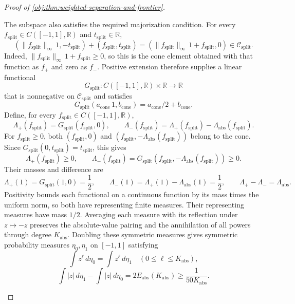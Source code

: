 \documentclass[11pt]{article}
\begin{document}
\begin{proof}[Proof of \cref{obj:thm:weighted-separation-and-frontier}]
\begin{enumerate}
The subspace also satisfies the required majorization condition. For every
\(f_{\mathrm{split}}\in C([-1,1],\mathbb R)\) and
\(t_{\mathrm{split}}\in\mathbb R\),
\[
(\|f_{\mathrm{split}}\|_\infty\,1,-t_{\mathrm{split}})
 +(f_{\mathrm{split}},t_{\mathrm{split}})
=(\|f_{\mathrm{split}}\|_\infty\,1+f_{\mathrm{split}},0)
\in\mathcal C_{\mathrm{split}}.
\]
Indeed, \(\|f_{\mathrm{split}}\|_\infty\,1+f_{\mathrm{split}}\ge0\), so this is the cone element obtained with that function as \(f_+\) and zero as \(f_-\). Positive extension therefore supplies a linear functional
\[
G_{\mathrm{split}}:C([-1,1],\mathbb R)\times\mathbb R\longrightarrow\mathbb R
\]
that is nonnegative on \(\mathcal C_{\mathrm{split}}\) and satisfies
\[
G_{\mathrm{split}}(a_{\mathrm{cone}}\,1,b_{\mathrm{cone}})
=a_{\mathrm{cone}}/2+b_{\mathrm{cone}}.
\]
Define, for every \(f_{\mathrm{split}}\in C([-1,1],\mathbb R)\),
\[
\Lambda_+(f_{\mathrm{split}})=G_{\mathrm{split}}(f_{\mathrm{split}},0),
\qquad
\Lambda_-(f_{\mathrm{split}})
=\Lambda_+(f_{\mathrm{split}})-\Lambda_{\mathrm{abs}}(f_{\mathrm{split}}).
\]
For \(f_{\mathrm{split}}\ge0\), both
\((f_{\mathrm{split}},0)\) and
\((f_{\mathrm{split}},-\Lambda_{\mathrm{abs}}(f_{\mathrm{split}}))\) belong to the cone. Since
\(G_{\mathrm{split}}(0,t_{\mathrm{split}})=t_{\mathrm{split}}\), this gives
\[
\Lambda_+(f_{\mathrm{split}})\ge0,
\qquad
\Lambda_-(f_{\mathrm{split}})
=G_{\mathrm{split}}(f_{\mathrm{split}},-\Lambda_{\mathrm{abs}}(f_{\mathrm{split}}))\ge0.
\]
Their masses and difference are
\[
\Lambda_+(1)=G_{\mathrm{split}}(1,0)=\frac12,
\qquad
\Lambda_-(1)=\Lambda_+(1)-\Lambda_{\mathrm{abs}}(1)=\frac12,
\qquad
\Lambda_+-\Lambda_-=\Lambda_{\mathrm{abs}}.
\]
Positivity bounds each functional on a continuous function by its mass times the uniform norm, so both have representing finite measures.
Their representing measures have mass \(1/2\). Averaging each measure with its reflection under \(z\mapsto-z\) preserves the absolute-value pairing and the annihilation of all powers through degree \(K_{\mathrm{abs}}\). Doubling these symmetric measures gives symmetric probability measures
\(\eta_0,\eta_1\) on \([-1,1]\) satisfying
\[
\int z^\ell\,d\eta_0=\int z^\ell\,d\eta_1
\quad(0\le\ell\le K_{\mathrm{abs}}),
\]
\[
\int|z|\,d\eta_1-\int|z|\,d\eta_0
=2E_{\mathrm{abs}}(K_{\mathrm{abs}})
\ge\frac1{50K_{\mathrm{abs}}}.
\]


\end{enumerate}
\end{proof}
\end{document}
